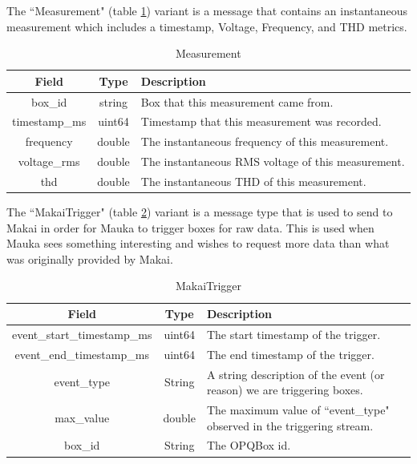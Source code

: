 The ``Measurement" (table \ref{table:Measurement}) variant is a message that contains an instantaneous measurement which includes a timestamp, Voltage, Frequency, and THD metrics.

\begin{table}[H]
	\centering
	\caption{Measurement}
	\begin{tabular}{|c|c|p{8cm}|}
		\hline 
		Field & Type & Description  \\ 
		\hline 
		box\_id & string  & Box that this measurement came from. \\ 
		\hline
		timestamp\_ms & uint64 & Timestamp that this measurement was recorded. \\
		\hline
		frequency & double & The instantaneous frequency of this measurement. \\
		\hline
		voltage\_rms & double & The instantaneous RMS voltage of this measurement. \\
		\hline
		thd & double & The instantaneous THD of this measurement. \\
		\hline 
	\end{tabular} 
	\label{table:Measurement}
\end{table}

The ``MakaiTrigger" (table \ref{table:MakaiTrigger}) variant is a message type that is used to send to Makai in order for Mauka to trigger boxes for raw data. This is used when Mauka sees something interesting and wishes to request more data than what was originally provided by Makai.

\begin{table}[H]
	\centering
	\caption{MakaiTrigger}
	\begin{tabular}{|c|c|p{8cm}|}
		\hline 
		Field & Type & Description  \\ 
		\hline 
		event\_start\_timestamp\_ms & uint64  & The start timestamp of the trigger. \\ 
		\hline
		event\_end\_timestamp\_ms & uint64 & The end timestamp of the trigger. \\
		\hline
		event\_type & String & A string description of the event (or reason) we are triggering boxes. \\
		\hline
		max\_value & double & The maximum value of ``event\_type" observed in the triggering stream. \\
		\hline 
		box\_id & String & The OPQBox id. \\
		\hline
	\end{tabular} 
	\label{table:MakaiTrigger}
\end{table}

